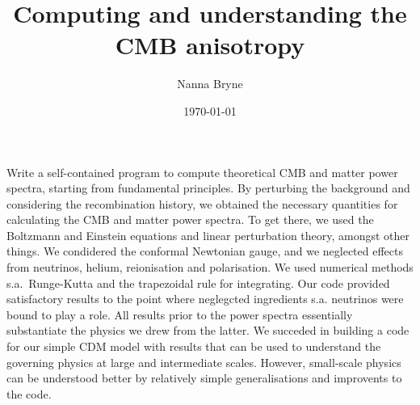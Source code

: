 





\title{Computing and understanding the CMB anisotropy}

\author{Nanna Bryne
}
\date{\today}  


    {Write a self-contained program to compute theoretical CMB and matter power spectra, starting from fundamental principles.} %
    {By perturbing the background and considering the recombination history, we obtained the necessary quantities for calculating the CMB and matter power spectra. To get there, we used the Boltzmann and Einstein equations and linear perturbation theory, amongst other things. We condidered the conformal Newtonian gauge, and we neglected effects from neutrinos, helium, reionisation and polarisation. We used numerical methods s.a.~Runge-Kutta and the trapezoidal rule for integrating.}  %
    {Our code provided satisfactory results to the point where neglegcted ingredients s.a. neutrinos were bound to play a role. All results prior to the power spectra essentially substantiate the physics we drew from the latter.} %
    {We succeded in building a code for our simple \textLambda CDM model with results that can be used to understand the governing physics at large and intermediate scales. However, small-scale physics can be understood better by relatively simple generalisations and improvents to the code.} %


\maketitle



